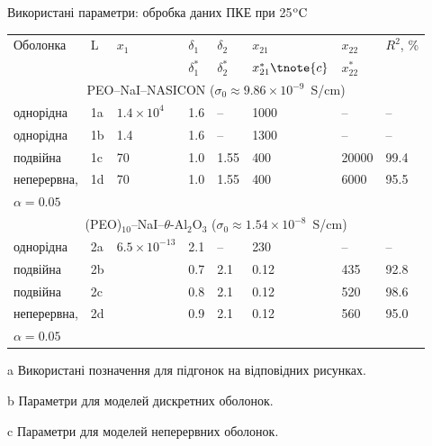 \documentclass[10pt]{beamer}
\begin{document}
\begin{frame}{Використані параметри: обробка даних ПКЕ при 25$\rm ^{o}C$}
\footnotesize

\begin{table}[tb]
	\centering 
	\begin{threeparttable}
		\begin{tabular}{|l|l|l|l|l|l|l|l|}
			\hline
			\multirow{2}{*}{Оболонка} &\multirow{2}{*}{L\tnote{a}} &   \multirow{2}{*}{$x_1$} & $\delta_1$\tnote{b} & $\delta_2$\tnote{b}  & $x_{21}$\tnote{b} & $x_{22}$\tnote{b} &  \multirow{2}{*}{$R^2$, \%} \\
			&  & & $\delta^\ast_1$\tnote{c}& $\delta^\ast_2$\tnote{c}&$x^\ast_{21}\tnote{c}$&$x^\ast_{22}$\tnote{c} & \\
			\hline
			\multicolumn{8}{c}{PEO--NaI--NASICON ($\sigma_0 \approx 9.86\times 10^{-9}$~S/cm)}\\
			\hline
			однорідна  &1a   & $1.4\times 10^4$ &1.6& -- &  1000& -- & --  \\
			однорідна                 &1b                                       &1.4             &1.6& -- &  1300& -- & --  \\
			подвійна                 &1c                                       &70              &1.0&1.55&  400  &  20000 &  99.4 \\
			неперервна, &1d                   &70              &1.0&1.55&  400 &  6000 &  95.5 \\
			$\alpha =0.05$   & & & & & &  &   \\
			\hline
			\multicolumn{8}{c}{(PEO)$_{10}$--NaI--$\theta$-Al$_2$O$_3$ ($\sigma_0 \approx 1.54\times 10^{-8}$~S/cm)}\\
			\hline
			однорідна &2a & \multirow{5}{*}{$6.5\times 10^{-13}$} &2.1&--&230&--&--  \\
			подвійна &2b                                       &                   &0.7&2.1&0.12&435& 92.8\\
			подвійна &2c                                       &                   &0.8&2.1&0.12&520& 98.6\\
			неперервна, &2d                                  &                   &0.9&2.1&0.12&560& 95.0\\
			$\alpha =0.05$  &  &  & & & &  &   \\
			\hline
		\end{tabular}
		\begin{tablenotes}
			\item[a] Використані позначення для підгонок на відповідних
			рисунках.
			\item[b] Параметри для моделей дискретних оболонок.
			\item[c] Параметри для моделей неперервних оболонок.
		\end{tablenotes}
	\end{threeparttable}
\end{table}

\end{frame}
\end{document}
